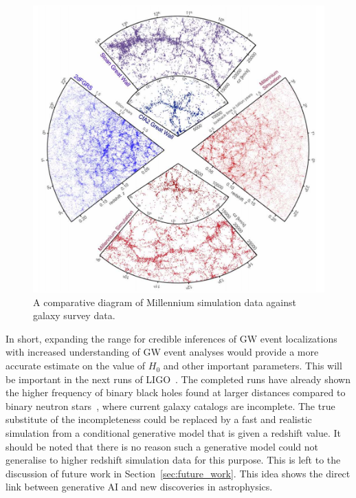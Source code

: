 \documentclass[twocolumn]{article}
\numberwithin{equation}{section}
\begin{document}
\begin{figure}[hbt!]
\includegraphics[width=\columnwidth]{figures/diagrams/mill_catalog_comparison.png}
\centering
\caption[]{A comparative diagram of Millennium simulation data against galaxy survey data\protect\footnotemark.}
\label{fig:gal_catalogs}
\end{figure}


In short, expanding the range for credible inferences of GW event localizations with increased understanding of GW event analyses would provide a more accurate estimate on the value of $H_0$ and other important parameters. This will be important in the next runs of LIGO~\cite{future_ligo}. The completed runs have already shown the higher frequency of binary black holes found at larger distances compared to binary neutron stars~\cite{GW_BNS_BBH_catalog}, where current galaxy catalogs are incomplete. The true substitute of the incompleteness could be replaced by a fast and realistic simulation from a conditional generative model that is given a redshift value. It should be noted that there is no reason such a generative model could not generalise to higher redshift simulation data for this purpose. This is left to the discussion of future work in Section~\ref{sec:future_work}. This idea shows the direct link between generative AI and new discoveries in astrophysics.
\end{document}
